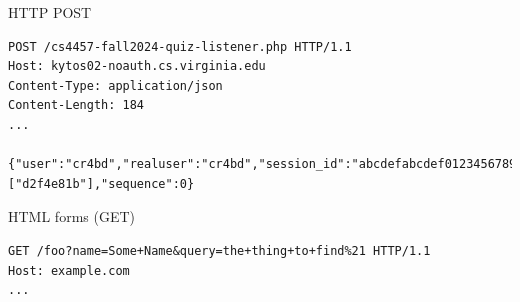 \begin{frame}[fragile]{HTTP POST}
\begin{Verbatim}[fontsize=\small]
POST /cs4457-fall2024-quiz-listener.php HTTP/1.1
Host: kytos02-noauth.cs.virginia.edu
Content-Type: application/json
Content-Length: 184
...

{"user":"cr4bd","realuser":"cr4bd","session_id":"abcdefabcdef0123456789aaaaaaaaaaaaaaaaaaaaaaaaaaaaaaaaaaaaaaaaaa","quiz":"week09","slug":"71d45222","answer":["d2f4e81b"],"sequence":0}
\end{Verbatim}
\end{frame}

\begin{frame}[fragile]{HTML forms (GET)}
\begin{Verbatim}[fontsize=\small]
GET /foo?name=Some+Name&query=the+thing+to+find%21 HTTP/1.1
Host: example.com
...
\end{Verbatim}
\end{frame}

